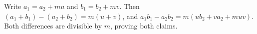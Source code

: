 Write $a_1=a_2+mu$ and $b_1=b_2+mv$. Then $(a_1+b_1)-(a_2+b_2)=m(u+v)$, and $a_1b_1-a_2b_2=m(ub_2+va_2+muv)$. Both differences are divisible by $m$, proving both claims.
